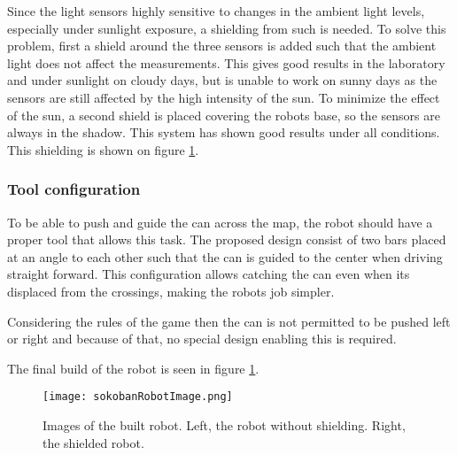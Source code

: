 Since the light sensors highly sensitive to changes in the ambient light levels, especially under sunlight exposure, a shielding from such is needed.
To solve this problem, first a shield around the three sensors is added such that the ambient light does not affect the measurements.
This gives good results in the laboratory and under sunlight on cloudy days, but is unable to work on sunny days as the sensors are still affected by the high intensity of the sun.
To minimize the effect of the sun, a second shield is placed covering the robots base, so the sensors are always in the shadow.
This system has shown good results under all conditions.
This shielding is shown on figure \ref{fig:robotImage}.



\subsubsection{Tool configuration}

To be able to push and guide the can across the map, the robot should have a proper tool that allows this task. 
The proposed design consist of two bars placed at an angle to each other such that the can is guided to the center when driving straight forward.
This configuration allows catching the can even when its displaced from the crossings, making the robots job simpler.

Considering the rules of the game then the can is not permitted to be pushed left or right and because of that, no special design enabling this is required.


The final build of the robot is seen in figure \ref{fig:robotImage}.

\begin{figure}[H]
\texttt{[image: sokobanRobotImage.png]}
\centering
\caption[Images of the built robot.]{Images of the built robot. Left, the robot without shielding. Right, the shielded robot.}
\label{fig:robotImage}
\end{figure}

